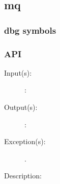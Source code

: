 %
%
%
%
%              

\subsection{mq}
\label{mq}

\subsubsection{dbg symbols}

\subsubsection{API}
\begin{description}
\label{mq_}
\item[{\cfunc[]{mq\_}{}}: ]
	\begin{description}\item[]
	\item[Input(s): ]
		\begin{description}\item[]
		\item[: ]
		\end{description}
	\item[Output(s): ]
		\begin{description}\item[]
		\item[: ]
		\end{description}
	\item[Exception(s): ]
		\begin{description}\item[]
		\item[.]
		\end{description}
	\item[Description: ]
	\end{description}
\end{description}
